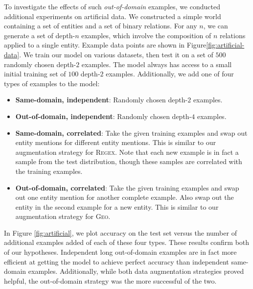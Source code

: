\documentclass[11pt,letterpaper]{article}
\newcommand{\regex}{\textsc{Regex}\xspace}
\newcommand{\geo}{\textsc{Geo}\xspace}
\newcommand\rj[1]{}
\begin{document}
To investigate the effects of such \emph{out-of-domain} examples,
we conducted additional experiments on artificial data.
We constructed a simple world containing a set of entities
and a set of binary relations.
For any $n$, we can generate a set of depth-$n$ examples,
which involve the composition of $n$ relations
applied to a single entity.
Example data points are shown in Figure\ref{fig:artificial-data}.
We train our model on various datasets,
then test it on a set of $500$ randomly chosen depth-$2$ examples.
The model always has access to a small initial training set of $100$ depth-$2$ examples.
Additionally, we add one of four types of examples to the model:
\begin{itemize}
  \item \textbf{Same-domain, independent}: Randomly chosen depth-$2$ examples.
  \item \textbf{Out-of-domain, independent}: Randomly chosen depth-$4$ examples.
  \item \textbf{Same-domain, correlated}: Take the given training examples
    and swap out entity mentions for different entity mentions.
    This is similar to our augmentation strategy for \regex.
    Note that each new example is in fact a sample from the test distribution,
    though these samples are correlated with the training examples.
  \item \textbf{Out-of-domain, correlated}: Take the given training examples
    and swap out one entity mention for another complete example.
    Also swap out the entity in the second example for a new entity.
    This is similar to our augmentation strategy for \geo.
\end{itemize}
In Figure \ref{fig:artificial}, we plot accuracy on the test set 
versus the number of additional examples added of each of these four types.
These results confirm both of our hypotheses.  
Independent long out-of-domain examples are in fact more efficient
at getting the model to achieve perfect accuracy than independent same-domain examples.
Additionally, while both data augmentation strategies proved helpful,
the out-of-domain strategy was the more successful of the two.
\rj{I'm sort of lying when I say "independent" in this section because
  what I'm doing is randomly sampling without replacement,
  as randomly sampling with replacement just seemed silly.
Is there a better way to phrase this?}
\end{document}
